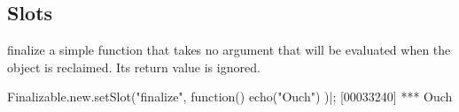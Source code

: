 \subsection{Slots}

\begin{urbiscriptapi}
\item[finalize] a simple function that takes no argument that will be
  evaluated when the object is reclaimed.  Its return value is
  ignored.
\begin{urbiscript}
Finalizable.new.setSlot("finalize", function() { echo("Ouch") })|;
[00033240] *** Ouch
\end{urbiscript}
\end{urbiscriptapi}

